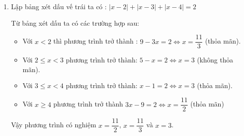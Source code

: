 \begin{bt}
{\begin{enumerate}
\begin{itemize}
				\item Với $x\geq 3$ phương trình trở thành $2x+2=9\Leftrightarrow x=\dfrac{7}{2}$ (thỏa mãn)
			\end{itemize}
			Vậy phương trình có nghiệm $x=\dfrac{11}{2}$ và $x=\dfrac{7}{2}$.
			\item 
			Lập bảng xét dấu vế trái ta có :
			$\left| x-2\right|+\left| x-3\right|+\left| x-4\right|=2$
			\begin{center}
			\end{center}
			Từ bảng xét dấu ta có các trường hợp sau: 
			\begin{itemize}
				\item Với $x<2$ thì phương trình trở thành : $9-3x=2\Leftrightarrow x=\dfrac{11}{3}$ (thỏa mãn).
				\item Với $2\leq x<3$ phương trình trở thành: $5-x=2\Leftrightarrow x=3$ (không thỏa mãn).
				\item Với $3\leq x<4$ phương trình trở thành: $x-1=2\Leftrightarrow x=3$ (thỏa mãn).
				\item Với $x\geq 4$ phương trình trở thành $3x-9=2\Leftrightarrow x=\dfrac{11}{2}$ (thỏa mãn)
			\end{itemize}
			Vậy phương trình có nghiệm $x=\dfrac{11}{2}$, $x=\dfrac{11}{3}$ và $x=3$.
		\end{enumerate}
	}
\end{bt}

